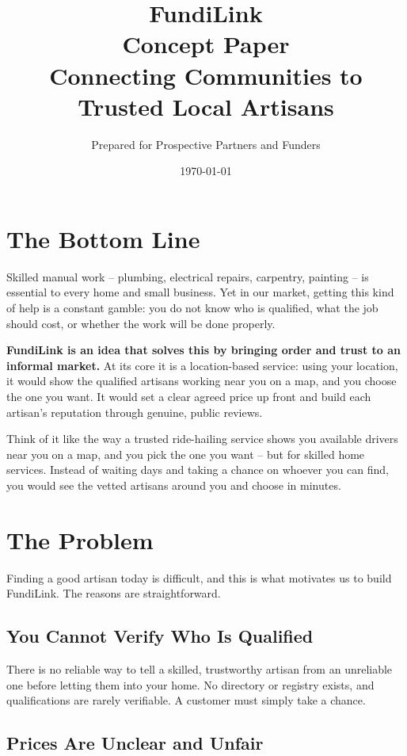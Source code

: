 \documentclass[11pt,a4paper]{article}
\title{\vspace{-1.5cm}\Huge\textbf{FundiLink}\\[0.5em]
\Large Concept Paper\\[0.3em]
\normalsize Connecting Communities to Trusted Local Artisans}
\author{Prepared for Prospective Partners and Funders}
\date{\today}
\begin{document}
\maketitle

\section{The Bottom Line}

Skilled manual work -- plumbing, electrical repairs, carpentry, painting -- is essential to
every home and small business. Yet in our market, getting this kind of help is a constant
gamble: you do not know who is qualified, what the job should cost, or whether the work will
be done properly.

\textbf{FundiLink is an idea that solves this by bringing order and trust to an informal
market.} At its core it is a location-based service: using your location, it would show the
qualified artisans working near you on a map, and you choose the one you want. It would set a
clear agreed price up front and build each artisan's reputation through genuine, public
reviews.

Think of it like the way a trusted ride-hailing service shows you available drivers near you on
a map, and you pick the one you want -- but for skilled home services. Instead of waiting days
and taking a chance on whoever you can find, you would see the vetted artisans around you and
choose in minutes.

\section{The Problem}

Finding a good artisan today is difficult, and this is what motivates us to build FundiLink.
The reasons are straightforward.

\subsection{You Cannot Verify Who Is Qualified}

There is no reliable way to tell a skilled, trustworthy artisan from an unreliable one before
letting them into your home. No directory or registry exists, and qualifications are rarely
verifiable. A customer must simply take a chance.

\subsection{Prices Are Unclear and Unfair}
\end{document}
